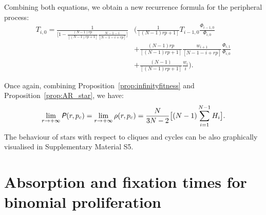 \documentclass[a4paper,english,10pt]{amsart}
\newcommand{\Rho}{\emph{\textsf{P\hspace{0.1ex}}}}
\newtheorem{proposition}{\bf Proposition}[section]
\theoremstyle{definition}
\numberwithin{equation}{section}
\begin{document}
Combining both equations, we obtain a new recurrence formula for the peripheral process: 
\begin{align} \label{eq:TFrecurrent}
T_{i,0} = \frac{\displaystyle 1}{\displaystyle
\Big[ 1 - \frac{(N-1)rp}{[(N-1)rp+1]}\frac{N-1-i}{[N-1-i+rp]} \Big]} 
&  \Big( \frac{1}{[(N-1)rp+1]} T_{i-1,0}  \frac{\Phi_{i-1,0}}{\Phi_{i,0}} \nonumber \\
 & + \frac{(N-1)rp}{[(N-1)rp+1]}\frac{w_{i+1}}{[N-1-i+rp]} \frac{\Phi_{i,1}}{\Phi_{i,0}}\\
& + \frac{(N-1)}{[(N-1)rp+1]}\frac{w_i}{i} \Big). \nonumber
\end{align}


\noindent
Once again, combining Proposition~\ref{prop:infinityfitness} and Proposition~\ref{prop:AR_star}, we have: 
$$\lim_{r \to +\infty} \Rho(r,p_c)  = \lim_{r \to +\infty} \rho(r,p_c)  = \frac{N}{3N-2} 
 \big[ (N-1) \sum_{i=1}^{N-1} H_ i \big].
$$
The behaviour of stars with respect to cliques and cycles can be also graphically visualised in Supplementary Material S5.

\section{Absorption and fixation times for binomial proliferation}
\label{Sbinomial}
\end{document}
